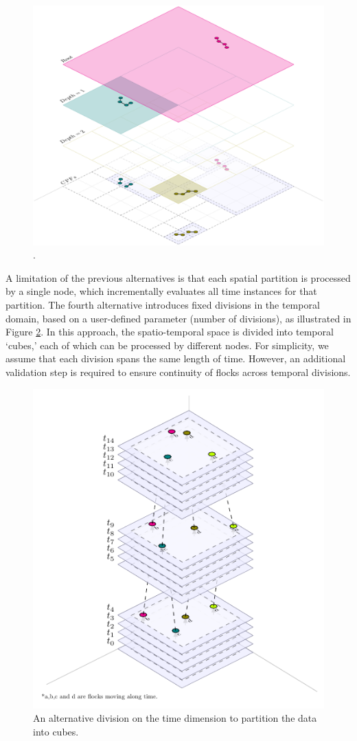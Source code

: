 \begin{figure}
    \centering
    \includegraphics[width=0.75\linewidth]
    {chapterPFlocks/figures/plots/11_temporal_partitions/LCA}
    \caption{.}\label{fig:lcal_alternative}
\end{figure}

A limitation of the previous alternatives is that each spatial partition is processed by a single node, which incrementally evaluates all time instances for that partition. The fourth alternative introduces fixed divisions in the temporal domain, based on a user-defined parameter (number of divisions), as illustrated in Figure \ref{fig:cube_alternative}. In this approach, the spatio-temporal space is divided into temporal `cubes,' each of which can be processed by different nodes. For simplicity, we assume that each division spans the same length of time. However, an additional validation step is required to ensure continuity of flocks across temporal divisions.

\begin{figure}
    \centering
    \includegraphics[width=0.9\linewidth]
    {chapterPFlocks/figures/plots/11_temporal_partitions/Cube-based}
    \caption{An alternative division on the time dimension to partition the data into cubes.}\label{fig:cube_alternative}
\end{figure}
